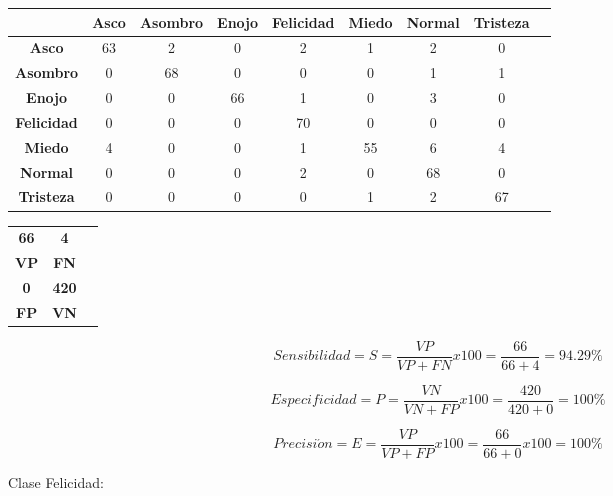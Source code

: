 \begin{table}[ht!]
\centering
\begin{tabular}{|c|c|c|c|c|c|c|c|c|} \hline
 & \bf Asco & \bf Asombro & \bf Enojo & \bf Felicidad & \bf Miedo & \bf Normal & \bf Tristeza \\ \hline
\bf Asco & 63 & 2 & 0 & 2 & 1 & 2 & 0 \\ \hline
\bf Asombro & 0 & 68 & 0 & 0 & 0 & 1 & 1 \\ \hline
\bf Enojo & 0 & 0 & 66 & 1 & 0 & 3 & 0 \\ \hline
\bf Felicidad & 0 & 0 & 0 & 70 & 0 & 0 & 0 \\ \hline
\bf Miedo & 4 & 0 & 0 & 1 & 55 & 6 & 4 \\ \hline
\bf Normal & 0 & 0 & 0 & 2 & 0 & 68 & 0 \\ \hline
\bf Tristeza & 0 & 0 & 0 & 0 & 1 & 2 & 67 \\ \hline

\end{tabular}
\end{table}

\begin{table}[ht!]
\centering
\begin{tabular}{|c|c|c|} \hline
\bf 66 \par & \bf 4 \par \\
\bf VP & \bf FN \\ \hline
\bf 0 \par & \bf 420 \par \\ 
\bf FP & \bf VN \\ \hline 
\end{tabular}
\end{table}

\begin{equation}
Sensibilidad=S=\frac{VP}{VP+FN}x100=\frac{66}{66+4}=94.29\%
\end{equation}

\begin{equation}
Especificidad=P=\frac{VN}{VN+FP}x100=\frac{420}{420+0}=100\%
\end{equation}

\begin{equation}
Precisi\acute{o}n=E=\frac{VP}{VP+FP}x100=\frac{66}{66+0}x100=100\%
\end{equation}

\vskip 5cm

Clase Felicidad:

